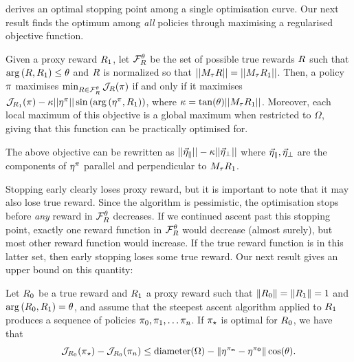  derives an optimal stopping point among a single optimisation curve. Our next result finds the optimum among \textit{all} policies through maximising a regularised objective function.

\begin{proposition}\label{thm:regularised_reward}
    Given a proxy reward $R_1$, let $\mathcal{F}_{R}^\theta$ be the set of possible true rewards
    $R$ such that 
    $\mathrm{arg}\left({R}, {R_1}\right) \leq \theta$ and $R$ is normalized so that $||M_\tau R|| = ||M_\tau R_1||$. Then, a policy $\pi$ maximises $\min_{R \in \mathcal{F}_{R}^\theta}\mathcal{J}_{R}(\pi)$ if and only if it maximises $\mathcal{J}_{R_1}(\pi)- \kappa ||\mathbf{\eta^{\pi}}|| \sin\left(\mathrm{arg}\left({\mathbf{\eta^{\pi}}}, {R_1}\right)\right)$,
    where 
    $\kappa = \tan(\theta)||M_\tau R_1||$. Moreover, each local maximum of this objective is a global maximum when restricted to $\Omega$, giving that this function can be practically optimised for.
\end{proposition}

The above objective can be rewritten as 
$||\vec{\eta}_{\parallel}||-\kappa||\vec{\eta}_{\perp}||$
where $\vec{\eta}_{\parallel}, \vec{\eta}_{\perp}$ are the components of $\mathbf{\eta^{\pi}}$ parallel and perpendicular to $M_\tau R_1$. 

Stopping early clearly loses proxy reward, but it is important to note that it may also lose true reward. Since the algorithm is pessimistic, the optimisation stops before \textit{any} reward in $\mathcal{F}_{R}^\theta$ decreases. If we continued ascent past this stopping point, exactly one reward function in $\mathcal{F}_{R}^\theta$ would decrease (almost surely), but most other reward function would increase. If the true reward function is in this latter set, then early stopping loses some true reward. Our next result gives an upper bound on this quantity:

\begin{proposition}%
Let $R_0$ be a true reward and $R_1$ a proxy reward such that $\|R_0\| = \|R_1\| = 1$ and $\mathrm{arg}\left({R_0}, {R_1}\right) = \theta$, and assume that the steepest ascent algorithm applied to $R_1$ produces a sequence of policies $\pi_0, \pi_1, \dots \pi_n$. If $\pi_\star$ is optimal for $R_0$, we have that
$$
\mathcal{J}_{R_0}(\pi_\star) - \mathcal{J}_{R_0}(\pi_{n}) \leq 
\mathrm{diameter}(\Omega) - \| \mathbf{\eta^{\pi_{n}}} - \mathbf{\eta^{\pi_{0}}}\|\cos(\theta).
$$
\end{proposition}

